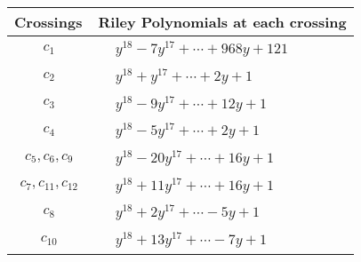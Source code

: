 \documentclass[1p]{elsarticle_modified}
\theoremstyle{definition}
\begin{document}
\begin{tabular}{m{50pt}|m{274pt}}
Crossings & \hspace{64pt}Riley Polynomials at each crossing \\
\hline $$\begin{aligned}c_{1}\end{aligned}$$&$\begin{aligned}
&y^{18}-7 y^{17}+\cdots+968 y+121
\end{aligned}$\\
\hline $$\begin{aligned}c_{2}\end{aligned}$$&$\begin{aligned}
&y^{18}+y^{17}+\cdots+2 y+1
\end{aligned}$\\
\hline $$\begin{aligned}c_{3}\end{aligned}$$&$\begin{aligned}
&y^{18}-9 y^{17}+\cdots+12 y+1
\end{aligned}$\\
\hline $$\begin{aligned}c_{4}\end{aligned}$$&$\begin{aligned}
&y^{18}-5 y^{17}+\cdots+2 y+1
\end{aligned}$\\
\hline $$\begin{aligned}c_{5},c_{6},c_{9}\end{aligned}$$&$\begin{aligned}
&y^{18}-20 y^{17}+\cdots+16 y+1
\end{aligned}$\\
\hline $$\begin{aligned}c_{7},c_{11},c_{12}\end{aligned}$$&$\begin{aligned}
&y^{18}+11 y^{17}+\cdots+16 y+1
\end{aligned}$\\
\hline $$\begin{aligned}c_{8}\end{aligned}$$&$\begin{aligned}
&y^{18}+2 y^{17}+\cdots-5 y+1
\end{aligned}$\\
\hline $$\begin{aligned}c_{10}\end{aligned}$$&$\begin{aligned}
&y^{18}+13 y^{17}+\cdots-7 y+1
\end{aligned}$\\
\hline
\end{tabular}\\~\\
\end{document}
